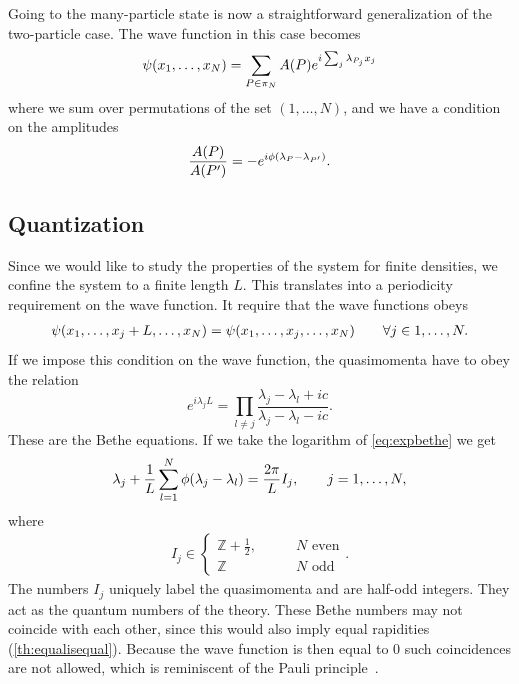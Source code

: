 \documentclass[11pt, a4paper]{report} %
\begin{document}
Going to the many-particle state is now a straightforward generalization of the two-particle case.
The wave function in this case becomes~\cite{Gaudin2009}
\begin{equation}
	\psi\qty(x_1,\ldots,x_N) = \sum_{P\in\pi_N} A(P) e^{i\sum_j \lambda_{P_j} x_j}
\end{equation}
where we sum over permutations of the set \((1,\ldots,N)\), and we have a condition on the amplitudes~\cite{Franchini2017}
\begin{align}
  \label{eq:41}
  \frac{A\qty(P)}{A\qty(P')} = -e^{i\phi\qty(\lambda_{P} - \lambda_{{P'}})}.
\end{align}


\subsection{Quantization}

Since we would like to study the properties of the system for finite densities, we confine the system to a finite length \(L\).
This translates into a periodicity requirement on the wave function.
It require that the wave functions obeys~\cite{Franchini2017}
\begin{align}
	\psi\qty(x_1,\ldots,x_j+L,\ldots,x_N) = \psi\qty(x_1,\ldots,x_j,\ldots,x_N) \qquad \forall j\in 1,\ldots,N.
\end{align}
If we impose this condition on the wave function, the quasimomenta have to obey the relation~\cite{Korepin1993}
\begin{equation}
  \label{eq:expbethe}
  e^{i\lambda_j L} = \prod_{l\neq j} \frac{\lambda_j-\lambda_l + ic}{\lambda_j - \lambda_l - ic}.
\end{equation}
These are the Bethe equations.
If we take the logarithm of \cref{eq:expbethe} we get
\begin{align}
  \label{eq:bethe_equations}
  \lambda_j + \frac{1}{L} \sum_{l=1}^N \phi\qty(\lambda_j - \lambda_l) = \frac{2\pi}{L}I_j, \qquad j = 1,\ldots,N,
\end{align}
where
\begin{align}
I_j \in 
\begin{cases}
  \mathbb{Z} + \frac{1}{2}, \qquad &N \textrm{ even}\\
  \mathbb{Z}  &N \textrm{ odd}
\end{cases}.
\end{align}
The numbers \(I_j\) uniquely label the quasimomenta and are half-odd integers. 
They act as the quantum numbers of the theory.
These Bethe numbers may not coincide with each other, since this would also imply equal rapidities (\cref{th:equalisequal}).
Because the wave function is then equal to 0 such coincidences are not allowed, which is reminiscent of the Pauli principle~\cite{Caux2009,Franchini2017}.
\end{document}
